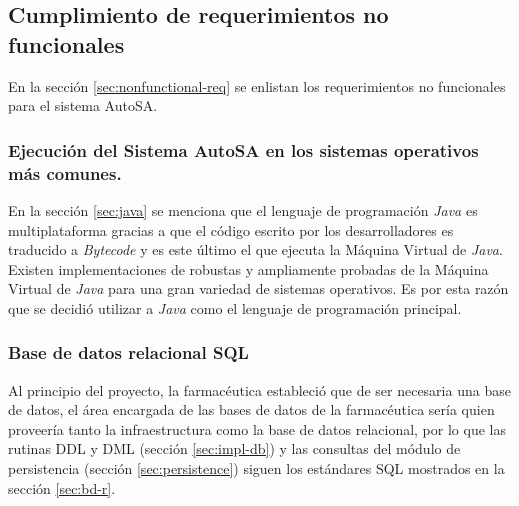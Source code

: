 \subsection{Cumplimiento de requerimientos no funcionales}
En la sección \ref{sec:nonfunctional-req} se enlistan los requerimientos no funcionales para el sistema AutoSA.
\subsubsection{Ejecución del Sistema AutoSA en los sistemas operativos más comunes.}
En la sección \ref{sec:java} se menciona que el lenguaje de programación \textit{Java} es multiplataforma gracias a que el código escrito por los desarrolladores es traducido a \textit{Bytecode} y es este último el que ejecuta la Máquina Virtual de \textit{Java}. Existen implementaciones de robustas y ampliamente probadas de la Máquina Virtual de \textit{Java} para una gran variedad de sistemas operativos. Es por esta razón que se decidió utilizar a \textit{Java} como el lenguaje de programación principal.
\subsubsection{Base de datos relacional SQL}
Al principio del proyecto, la farmacéutica estableció que de ser necesaria una base de datos, el área encargada de las bases de datos de la farmacéutica sería quien proveería tanto la infraestructura como la base de datos relacional, por lo que las rutinas DDL y DML (sección \ref{sec:impl-db}) y las consultas del módulo de persistencia (sección \ref{sec:persistence}) siguen los estándares SQL mostrados en la sección \ref{sec:bd-r}.

